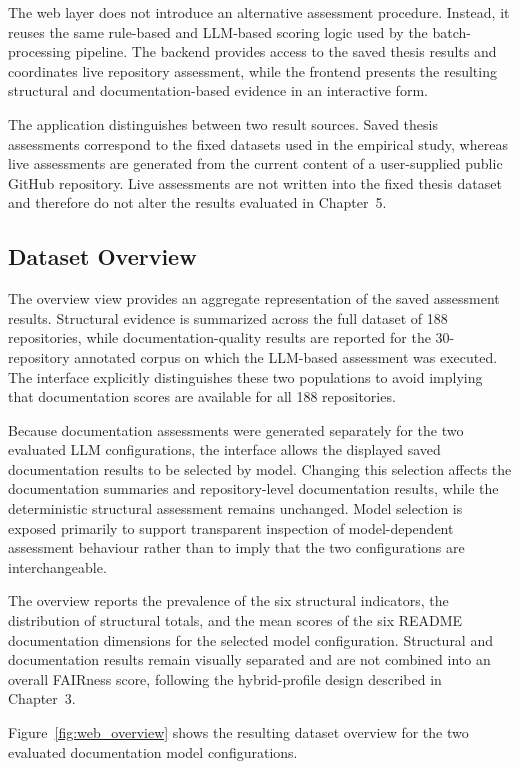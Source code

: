 The web layer does not introduce an alternative assessment procedure.
Instead, it reuses the same rule-based and LLM-based scoring logic used
by the batch-processing pipeline. The backend provides access to the
saved thesis results and coordinates live repository assessment, while
the frontend presents the resulting structural and documentation-based evidence in an interactive form.

The application distinguishes between two result sources. Saved thesis
assessments correspond to the fixed datasets used in the empirical
study, whereas live assessments are generated from the current content
of a user-supplied public GitHub repository. Live assessments are not
written into the fixed thesis dataset and therefore do not alter the
results evaluated in Chapter~5.

\subsection{Dataset Overview}

The overview view provides an aggregate representation of the saved
assessment results. Structural evidence is summarized across the full
dataset of 188 repositories, while documentation-quality results are
reported for the 30-repository annotated corpus on which the LLM-based
assessment was executed. The interface explicitly distinguishes these
two populations to avoid implying that documentation scores are
available for all 188 repositories.

Because documentation assessments were generated separately for the
two evaluated LLM configurations, the interface allows the displayed
saved documentation results to be selected by model. Changing this
selection affects the documentation summaries and repository-level
documentation results, while the deterministic structural assessment
remains unchanged. Model selection is exposed primarily to support
transparent inspection of model-dependent assessment behaviour rather
than to imply that the two configurations are interchangeable.

The overview reports the prevalence of the six structural indicators,
the distribution of structural totals, and the mean scores of the six
README documentation dimensions for the selected model configuration.
Structural and documentation results remain visually separated and are
not combined into an overall FAIRness score, following the
hybrid-profile design described in Chapter~3.

Figure~\ref{fig:web_overview} shows the resulting dataset overview for
the two evaluated documentation model configurations.

